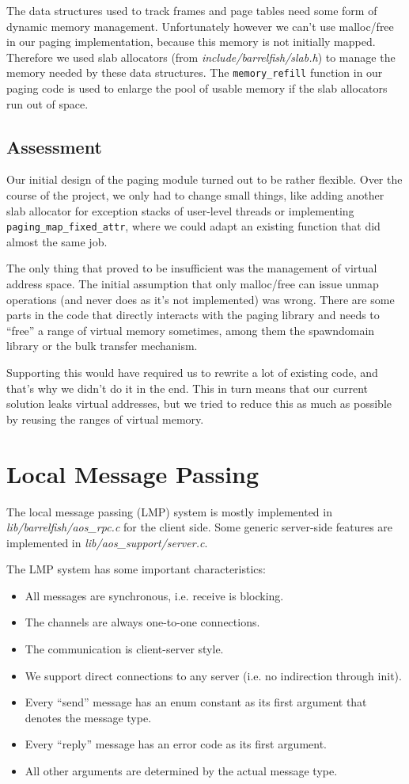 \documentclass[a4paper,10pt]{article}
\newcommand{\filepath}[1]{\emph{ #1}}
\begin{document}
The data structures used to track frames and page tables need some form of dynamic memory management.
Unfortunately however we can't use malloc/free in our paging implementation, because this memory is not initially mapped.
Therefore we used slab allocators (from \filepath{include/barrelfish/slab.h}) to manage the memory needed by these data structures.
The \lstinline!memory_refill! function in our paging code is used to enlarge the pool of usable memory if the slab allocators run out of space.

\subsection{Assessment}

Our initial design of the paging module turned out to be rather flexible.
Over the course of the project, we only had to change small things, like adding another slab allocator for exception stacks of user-level threads 
or implementing \lstinline!paging_map_fixed_attr!, where we could adapt an existing function that did almost the same job.

The only thing that proved to be insufficient was the management of virtual address space.
The initial assumption that only malloc/free can issue unmap operations (and never does as it's not implemented) was wrong.
There are some parts in the code that directly interacts with the paging library and needs to ``free'' a range of virtual memory sometimes, among them the spawndomain library or the bulk transfer mechanism.

Supporting this would have required us to rewrite a lot of existing code, and that's why we didn't do it in the end.
This in turn means that our current solution leaks virtual addresses, but we tried to reduce this as much as possible by reusing the ranges of virtual memory.

\section{Local Message Passing}

The local message passing (LMP) system is mostly implemented in \filepath{lib/barrelfish/aos\_rpc.c} for the client side.
Some generic server-side features are implemented in \filepath{lib/aos\_support/server.c}.

The LMP system has some important characteristics:
\begin{itemize}
 \item All messages are synchronous, i.e. receive is blocking.
 \item The channels are always one-to-one connections.
 \item The communication is client-server style.
 \item We support direct connections to any server (i.e. no indirection through init).
 \item Every ``send'' message has an enum constant as its first argument that denotes the message type.
 \item Every ``reply'' message has an error code as its first argument.
 \item All other arguments are determined by the actual message type.
\end{itemize}
\end{document}
